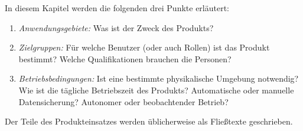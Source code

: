 \begin{tcolorbox}
In diesem Kapitel werden die folgenden drei Punkte erläutert:
\begin{enumerate}
	\item \textit{Anwendungsgebiete:} Was ist der Zweck des Produkts?
	\item \textit{Zielgruppen:} Für welche Benutzer (oder auch Rollen) ist das Produkt bestimmt?
	Welche Qualifikationen brauchen die Personen?
	\item \textit{Betriebsbedingungen:} Ist eine bestimmte physikalische Umgebung notwendig? 
	Wie ist die tägliche Betriebszeit des Produkts? 
	Automatische oder manuelle Datensicherung? 
	Autonomer oder beobachtender Betrieb?
\end{enumerate}

\noindent Der Teile des Produkteinsatzes werden üblicherweise als Fließtexte geschrieben.
\end{tcolorbox}